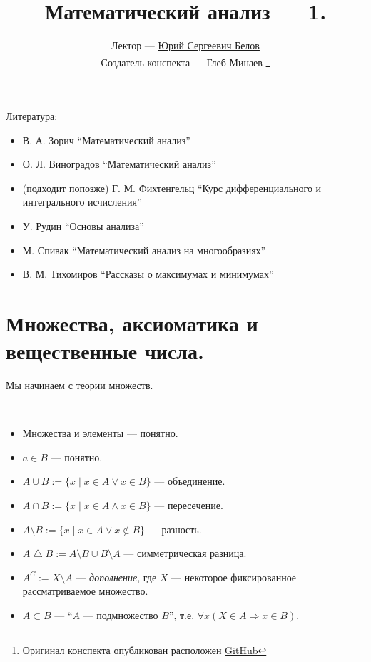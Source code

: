 \documentclass[12pt,a4paper]{article}
\title{Математический анализ --- 1.}
\author{Лектор --- \href{https://vk.com/ybelov}{Юрий Сергеевич Белов}\\
        Создатель конспекта --- Глеб Минаев
        \footnote{Оригинал конспекта опубликован расположен \href{https://github.com/lounres/SPbU-MCS-2020-M-lecture-notes}{GitHub}}}
\date{}
\begin{document}
    \maketitle

    Литература:
    \begin{itemize}
        \item В. А. Зорич ``Математический анализ''
        \item О. Л. Виноградов ``Математический анализ''
        \item (подходит попозже) Г. М. Фихтенгельц ``Курс дифференциального и интегрального исчисления''
        \item У. Рудин ``Основы анализа''
        \item М. Спивак ``Математический анализ на многообразиях''
        \item В. М. Тихомиров ``Рассказы о максимумах и минимумах''
    \end{itemize}

    \section{Множества, аксиоматика и вещественные числа.}

    Мы начинаем с теории множеств.

    \begin{definition}\ 
        \begin{itemize}
            \item Множества и элементы --- понятно.
            \item $a \in B$ --- понятно.
            \item $A \cup B := \{x \mid x\in A \vee x\in B\}$ --- объединение.
            \item $A \cap B := \{x \mid x\in A \wedge x\in B\}$ --- пересечение.
            \item $A \setminus B := \{x \mid x\in A \vee x\notin B\}$ --- разность.
            \item $A \bigtriangleup B := A \setminus B \cup B \setminus A$ --- симметрическая разница.
            \item $A^C := X\setminus A$ --- \emph{дополнение}, где $X$ --- некоторое фиксированное рассматриваемое множество.
            \item $A \subset B$ --- ``$A$ --- подмножество $B$'', т.е. $\forall x (X\in A \Rightarrow x\in B)$.
        \end{itemize}
    \end{definition}
\end{document}
